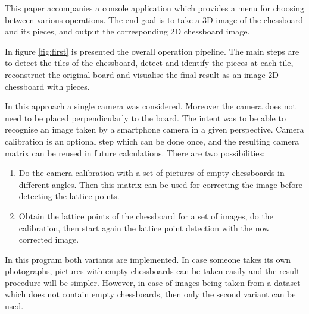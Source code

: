 \documentclass[conference]{IEEEtran}
\begin{document}
This paper accompanies a console application which provides a menu for choosing between various operations. The end goal is to take a 3D image of the chessboard and its pieces, and output the corresponding 2D chessboard image. 

In figure \ref{fig:first} is presented the overall operation pipeline. The main steps are to detect the tiles of the chessboard, detect and identify the pieces at each tile, reconstruct the original board and visualise the final result as an image 2D chessboard with pieces.


In this approach a single camera was considered. Moreover the camera does not need to be placed perpendicularly to the board. The intent was to be able to recognise an image taken by a smartphone camera in a given perspective. Camera calibration is an optional step which can be done once, and the resulting camera matrix can be reused in future calculations. There are two possibilities:

\begin{enumerate}
    \item Do the camera calibration with a set of pictures of empty chessboards in different angles. Then this matrix can be used for correcting the image before detecting the lattice points.
    \item Obtain the lattice points of the chessboard for a set of images, do the calibration, then start again the lattice point detection with the now corrected image.
\end{enumerate}

In this program both variants are implemented. In case someone takes its own photographs, pictures with empty chessboards can be taken easily and the result procedure will be simpler. However, in case of images being taken from a dataset which does not contain empty chessboards, then only the second variant can be used.






\end{document}

